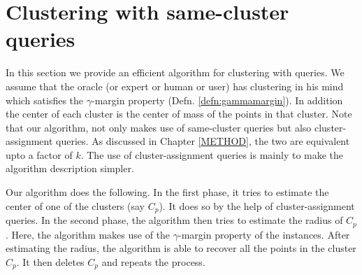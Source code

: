 \documentclass[letterpaper,12pt,titlepage,oneside,final]{book}
\begin{document}
\section{Clustering with same-cluster queries}
\label{section:clusteringWithQuery}

In this section we provide an efficient algorithm for clustering with queries. We assume that the oracle (or expert or human or user) has clustering in his mind which satisfies the $\gamma$-margin property (Defn. \ref{defn:gammamargin}). In addition the center of each cluster is the center of mass of the points in that cluster. Note that our algorithm, not only makes use of same-cluster queries but also cluster-assignment queries.  As discussed in Chapter \ref{METHOD}, the two are equivalent upto a factor of $k$. The use of cluster-assignment queries is mainly to make the algorithm description simpler.

Our algorithm does the following. In the first phase, it tries to estimate the center of one of the clusters (say $C_p$). It does so by the help of cluster-assignment queries. In the second phase, the algorithm then tries to estimate the radius of $C_p$. Here, the algorithm makes use of the $\gamma$-margin property of the instances. After estimating the radius, the algorithm is able to recover all the points in the cluster $C_p$. It then deletes $C_p$ and repeats the process. 
\end{document}
